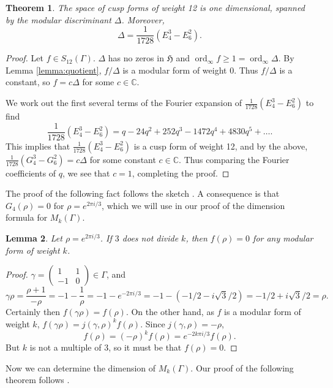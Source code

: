 \documentclass{article}
\newtheorem{theorem}{Theorem}
\newtheorem{lemma}[theorem]{Lemma}
\DeclareMathOperator{\ord}{ord}
\begin{document}
\begin{theorem}
The space of cusp forms of weight 12 is one dimensional, spanned by the modular discriminant $\Delta$. Moreover,
\begin{equation}
\label{eqn:1728}
\Delta=\frac{1}{1728}(E_4^3-E_6^2).
\end{equation}
\end{theorem}
\begin{proof}
Let $f \in S_{12}(\Gamma)$. $\Delta$ has no zeros in $\mathfrak{H}$ and $\ord_\infty f \geq 1=\ord_\infty \Delta$.
By Lemma \ref{lemma:quotient}, $f/\Delta$ is a modular form of weight $0$. Thus $f/\Delta$ is a constant, so
$f=c\Delta$ for some $c \in \mathbb{C}$. 
 
We work out the first several terms of the Fourier expansion of $\frac{1}{1728}(E_4^3-E_6^2)$ to find
\[
\frac{1}{1728}(E_4^3-E_6^2)=q-24q^2+252q^3-1472q^4+4830q^5+\ldots.
\]
This implies that
$\frac{1}{1728}(E_4^3-E_6^2)$ is a cusp form of weight 12, and by the above,
$\frac{1}{1728}(G_4^3-G_6^2)=c\Delta$ for some constant $c \in \mathbb{C}$.
Thus
comparing the Fourier coefficients of $q$, we see that
$c=1$, completing the proof.
\end{proof}

The proof of the following fact follows the sketch \cite[Exercise 1.3.3]{MR1431508}. A consequence is
that $G_4(\rho)=0$ for $\rho=e^{2\pi i/3}$, which we will use in our proof of the dimension formula for
$M_k(\Gamma)$.

\begin{lemma}
\label{lemma:rho}
Let $\rho=e^{2\pi i/3}$. If $3$ does not divide $k$, then $f(\rho)=0$ for any modular form of weight $k$.
\end{lemma}
\begin{proof}
$\gamma=\begin{pmatrix}1&1\\-1&0\end{pmatrix} \in \Gamma$, and
\[
\gamma \rho=\frac{\rho+1}{-\rho}=-1-\frac{1}{\rho}=-1-e^{-2\pi i/3}=-1-(-1/2  - i\sqrt{3}/2)=-1/2+i\sqrt{3}/2=\rho.
\]
Certainly then $f(\gamma \rho)=f(\rho)$.
On the other hand,
as
$f$ is a modular form of weight $k$, $f(\gamma \rho)=j(\gamma,\rho)^k f(\rho)$. Since $j(\gamma,\rho)=-\rho$,
\[
f(\rho)=(-\rho)^k f(\rho)=e^{-2k\pi i/3}f(\rho).
\]
But $k$ is not a multiple of 3, so it must be that $f(\rho)=0$.
\end{proof}

Now we can determine the dimension of $M_k(\Gamma)$.
Our proof of the following theorem follows \cite[Proposition 1.3.4]{MR1431508}.
\end{document}
